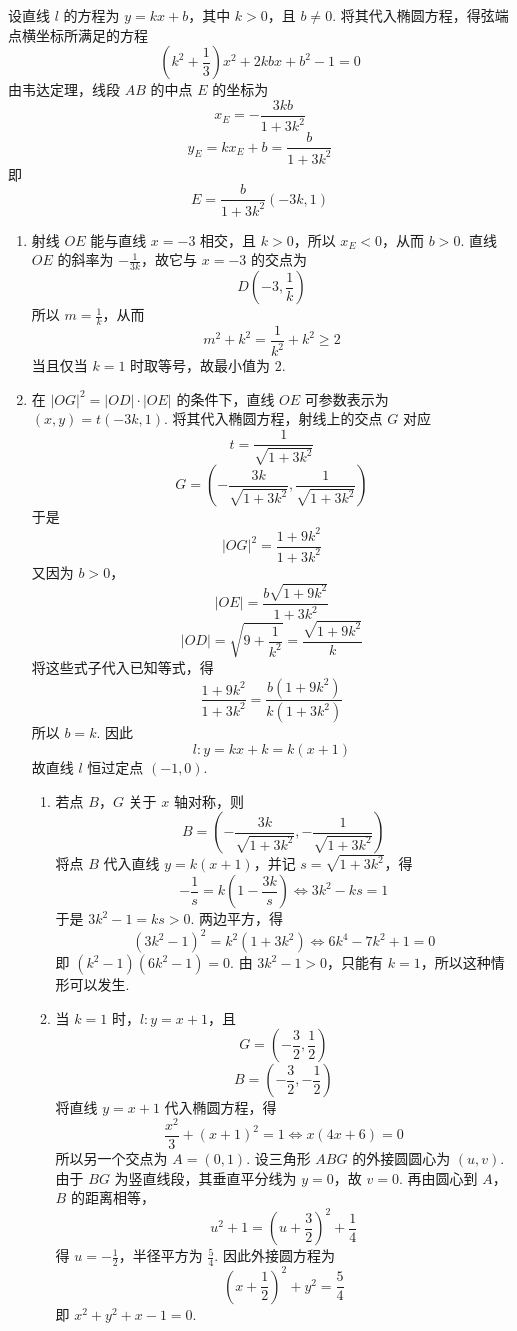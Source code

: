 \begin{solution}
设直线 \(l\) 的方程为 \(y=kx+b\)，其中 \(k>0\)，且 \(b\neq0\). 将其代入椭圆方程，得弦端点横坐标所满足的方程
\[
\left(k^{2}+\frac13\right)x^{2}+2kbx+b^{2}-1=0
\]
由韦达定理，线段 \(AB\) 的中点 \(E\) 的坐标为
\[
x_E=-\frac{3kb}{1+3k^{2}}
\]
\[
y_E=kx_E+b=\frac{b}{1+3k^{2}}
\]
即
\[
E=\frac{b}{1+3k^{2}}(-3k,1)
\]
\begin{enumerate}
\item 射线 \(OE\) 能与直线 \(x=-3\) 相交，且 \(k>0\)，所以 \(x_E<0\)，从而 \(b>0\). 直线 \(OE\) 的斜率为 \(-\frac{1}{3k}\)，故它与 \(x=-3\) 的交点为
\[
D\left(-3,\frac1k\right)
\]
所以 \(m=\frac1k\)，从而
\[
m^{2}+k^{2}=\frac1{k^{2}}+k^{2}\geqslant2
\]
当且仅当 \(k=1\) 时取等号，故最小值为 \(2\).

\item 在 \(\left|OG\right|^{2}=\left|OD\right|\cdot\left|OE\right|\) 的条件下，直线 \(OE\) 可参数表示为 \((x,y)=t(-3k,1)\). 将其代入椭圆方程，射线上的交点 \(G\) 对应
\[
t=\frac1{\sqrt{1+3k^{2}}}
\]
\[
G=\left(-\frac{3k}{\sqrt{1+3k^{2}}},\frac1{\sqrt{1+3k^{2}}}\right)
\]
于是
\[
\left|OG\right|^{2}=\frac{1+9k^{2}}{1+3k^{2}}
\]
又因为 \(b>0\)，
\[
\left|OE\right|=\frac{b\sqrt{1+9k^{2}}}{1+3k^{2}}
\]
\[
\left|OD\right|=\sqrt{9+\frac1{k^{2}}}=\frac{\sqrt{1+9k^{2}}}{k}
\]
将这些式子代入已知等式，得
\[
\frac{1+9k^{2}}{1+3k^{2}}=\frac{b(1+9k^{2})}{k(1+3k^{2})}
\]
所以 \(b=k\). 因此
\[
l:y=kx+k=k(x+1)
\]
故直线 \(l\) 恒过定点 \((-1,0)\).

\begin{enumerate}
\item 若点 \(B\)，\(G\) 关于 \(x\) 轴对称，则
\[
B=\left(-\frac{3k}{\sqrt{1+3k^{2}}},-\frac1{\sqrt{1+3k^{2}}}\right)
\]
将点 \(B\) 代入直线 \(y=k(x+1)\)，并记 \(s=\sqrt{1+3k^{2}}\)，得
\[
-\frac1s=k\left(1-\frac{3k}{s}\right)\iff 3k^{2}-ks=1
\]
于是 \(3k^{2}-1=ks>0\). 两边平方，得
\[
(3k^{2}-1)^{2}=k^{2}(1+3k^{2})\iff 6k^{4}-7k^{2}+1=0
\]
即 \((k^{2}-1)(6k^{2}-1)=0\). 由 \(3k^{2}-1>0\)，只能有 \(k=1\)，所以这种情形可以发生.

\item 当 \(k=1\) 时，\(l:y=x+1\)，且
\[
G=\left(-\frac32,\frac12\right)
\]
\[
B=\left(-\frac32,-\frac12\right)
\]
将直线 \(y=x+1\) 代入椭圆方程，得
\[
\frac{x^{2}}3+(x+1)^{2}=1\iff x(4x+6)=0
\]
所以另一个交点为 \(A=(0,1)\). 设三角形 \(ABG\) 的外接圆圆心为 \((u,v)\). 由于 \(BG\) 为竖直线段，其垂直平分线为 \(y=0\)，故 \(v=0\). 再由圆心到 \(A\)，\(B\) 的距离相等，
\[
u^{2}+1=\left(u+\frac32\right)^{2}+\frac14
\]
得 \(u=-\frac12\)，半径平方为 \(\frac54\). 因此外接圆方程为
\[
\left(x+\frac12\right)^{2}+y^{2}=\frac54
\]
即 \(x^{2}+y^{2}+x-1=0\).
\end{enumerate}
\end{enumerate}
\end{solution}
